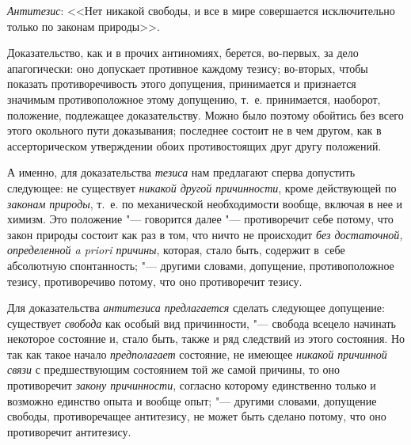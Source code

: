 {\em Антитезис}: <<Нет
никакой свободы, и все в мире совершается исключительно только по законам
природы>>.

Доказательство, как и в прочих антиномиях, берется, во-первых,
за дело апагогически: оно допускает противное каждому тезису; во-вторых,
чтобы показать противоречивость этого допущения, принимается и признается
значимым противоположное этому допущению, т.~е. принимается, наоборот,
положение, подлежащее доказательству. Можно было поэтому обойтись без всего
этого окольного пути доказывания; последнее состоит не в чем другом, как в
ассерторическом утверждении обоих противостоящих друг другу положений.

А именно, для доказательства
{\em тезиса} нам
предлагают сперва допустить следующее: не существует
{\em никакой другой причинности},
кроме действующей по
{\em законам природы},
т.~е. по механической необходимости вообще, включая в нее и
химизм. Это положение "--- говорится далее
"--- противоречит себе потому, что закон природы состоит как раз
в том, что ничто не происходит {\em без
достаточной, определенной a priori причины}, которая, стало
быть, содержит в~себе абсолютную спонтанность; "--- другими
словами, допущение, противоположное тезису, противоречиво потому, что оно
противоречит тезису.

Для доказательства
{\em антитезиса предлагается}
сделать следующее допущение: существует
{\em свобода} как особый
вид причинности, "--- свобода всецело начинать некоторое
состояние и, стало быть, также и ряд следствий из этого состояния. Но так
как такое начало {\em предполагает}
состояние, не имеющее
{\em никакой причинной связи}
с предшествующим состоянием той же самой причины, то оно
противоречит {\em закону причинности},
согласно которому единственно только и возможно единство
опыта и вообще опыт; "--- другими словами, допущение свободы,
противоречащее антитезису, не может быть сделано потому, что оно
противоречит антитезису.


